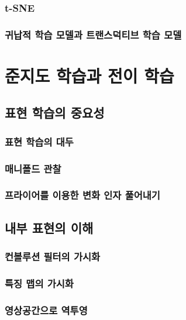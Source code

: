 \documentclass [12pt] {oblivoir}
\let\oldsubsubsection=\subsubsection
\renewcommand{\subsubsection}
{
  \filbreak
  \oldsubsubsection
}
\begin{document}
\subsubsection{t-SNE}

\subsubsection{귀납적 학습 모델과 트랜스덕티브 학습 모델}

\newpage
\section{준지도 학습과 전이 학습}

\subsection{표현 학습의 중요성}

\subsubsection{표현 학습의 대두}

\subsubsection{매니폴드 관찰}

\subsubsection{프라이어를 이용한 변화 인자 풀어내기}

\subsection{내부 표현의 이해}

\subsubsection{컨볼루션 필터의 가시화}

\subsubsection{특징 맵의 가시화}

\subsubsection{영상공간으로 역투영}
\end{document}
